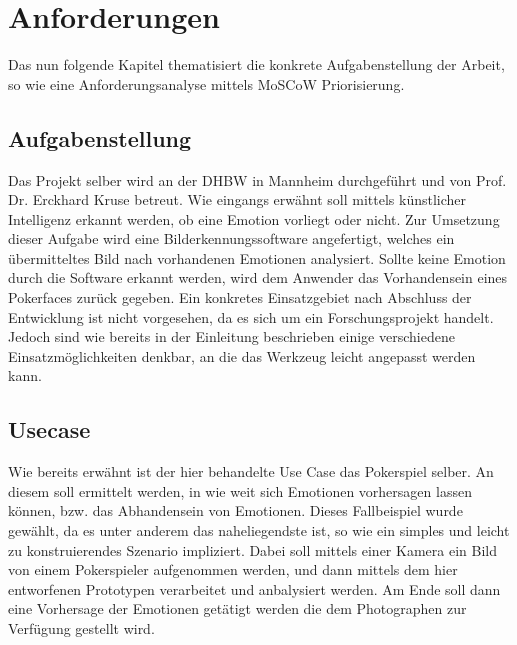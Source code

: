 \documentclass[12pt, a4paper]{scrbook}
\begin{document}
\chapter{Anforderungen}
Das nun folgende Kapitel thematisiert die konkrete Aufgabenstellung der Arbeit, so wie eine Anforderungsanalyse mittels MoSCoW Priorisierung. 
\section{Aufgabenstellung}
Das Projekt selber wird an der DHBW in Mannheim durchgeführt und von Prof. Dr. Erckhard Kruse betreut.
Wie eingangs erwähnt soll mittels künstlicher Intelligenz erkannt werden, ob eine Emotion vorliegt oder nicht.
Zur Umsetzung dieser Aufgabe wird eine Bilderkennungssoftware angefertigt, welches ein übermitteltes Bild nach vorhandenen Emotionen analysiert. Sollte keine Emotion durch die Software erkannt werden, wird dem Anwender das Vorhandensein eines Pokerfaces zurück gegeben. Ein konkretes Einsatzgebiet nach Abschluss der Entwicklung ist nicht
vorgesehen, da es sich um ein Forschungsprojekt handelt. Jedoch sind wie bereits in der Einleitung beschrieben einige verschiedene Einsatzmöglichkeiten denkbar, an die das Werkzeug leicht angepasst werden kann.

\section{Usecase}
Wie bereits erwähnt ist der hier behandelte Use Case das Pokerspiel selber. An diesem soll ermittelt werden, in wie weit sich Emotionen vorhersagen lassen können, bzw. das Abhandensein von Emotionen. Dieses Fallbeispiel wurde gewählt, da es unter anderem das naheliegendste ist, so wie ein simples und leicht zu konstruierendes Szenario impliziert. Dabei soll mittels einer Kamera ein Bild von einem Pokerspieler aufgenommen werden, und dann mittels dem hier entworfenen Prototypen verarbeitet und anbalysiert werden. Am Ende soll dann eine Vorhersage der Emotionen getätigt werden die dem Photographen zur Verfügung gestellt wird.
\end{document}
